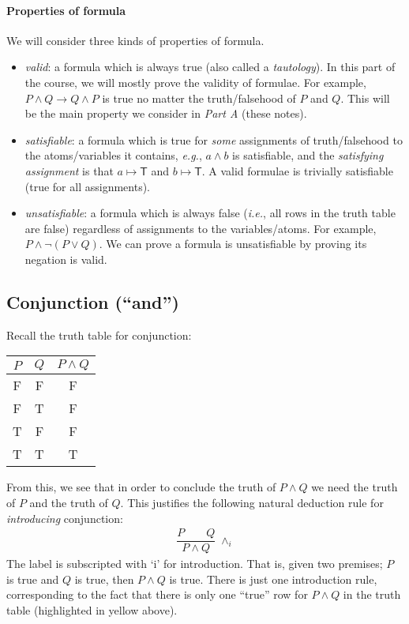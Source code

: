 \documentclass{article}
\theoremstyle{definition}
\newcommand{\ie}{\emph{i.e.}}
\newcommand{\eg}{\emph{e.g.}}
\begin{document}
\paragraph{Properties of formula}

We will consider three kinds of properties of formula.

\begin{itemize}[leftmargin=1.5em]
  \item \emph{valid}: a formula which is always true (also
  called a \emph{tautology}). In this part of the course, we will
  mostly prove the validity of formulae. For example, $P \wedge Q
  \rightarrow Q \wedge P$ is true no matter the
  truth/falsehood of $P$ and $Q$. This will be the main property we
  consider in \emph{Part A} (these notes).
%
  \item \emph{satisfiable}: a formula which is true for
  \emph{some} assignments of truth/falsehood to the atoms/variables it contains, \eg{},
  $a \wedge b$ is satisfiable, and the \emph{satisfying assignment} is that
  $a \mapsto \mathsf{T}$ and $b \mapsto \mathsf{T}$. A valid formulae
  is trivially satisfiable (true for all assignments).
%
  \item \emph{unsatisfiable}: a formula which is always false (\ie{}, all
  rows in the truth table are false) regardless of assignments to the
  variables/atoms. For example, $P \wedge \neg (P \vee Q)$. We can
  prove a formula is unsatisfiable by proving its negation is valid.
\end{itemize}

\subsection{Conjunction (``and'')}

Recall the truth table for conjunction:
%
\begin{center}
\begin{tabular}{cc|c}
  $P$ & $Q$ & $P \wedge Q$ \\ \hline
  F & F & F \\
  F & T & F \\
  T & F & F \\
\rowcolor{yellow}  T & T & T
\end{tabular}
\end{center}
%
From this, we see that in order to conclude the truth of $P \wedge Q$
we need the truth of $P$ and the truth of $Q$. This justifies the
following natural deduction rule for \emph{introducing} conjunction:
%
\begin{align*}
  \dfrac{P \qquad Q}
        {P \wedge Q} \; {\wedge_i}
\end{align*}
%
The label is subscripted with `i' for introduction.
That is, given two premises; $P$ is true and $Q$ is true, then
$P \wedge Q$ is true. There is just one introduction rule,
corresponding to the fact that there is only one ``true'' row
for $P \wedge Q$ in the truth table (highlighted in yellow above).
\end{document}

